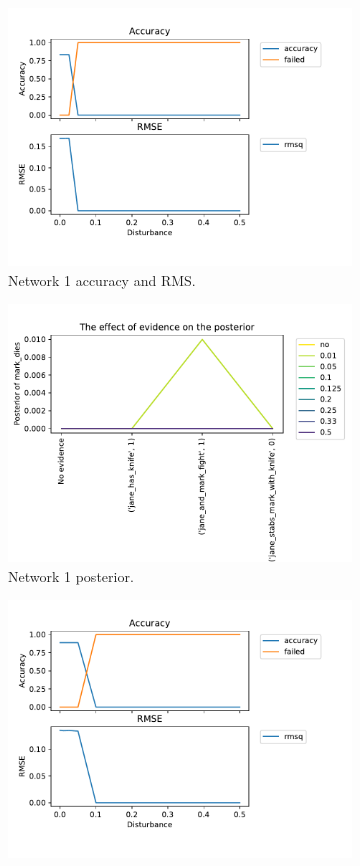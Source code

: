 \begin{enumerate}
\begin{figure}[htbp]
\begin{subfigure}{.5\textwidth}
 \centering
\includegraphics[width=0.9\linewidth]{images/performance_KB1.pdf}
\caption{Network 1 accuracy and RMS.}
\label{kb1a1}
\end{subfigure}%
\begin{subfigure}{.5\textwidth}
 \centering
\includegraphics[width=0.9\linewidth]{../experiments/VlekNetwork/plots/posterior_KB1.pdf}
\caption{Network 1 posterior.}
\label{kb1a}
\end{subfigure}
\begin{subfigure}{.5\textwidth}
\centering
\includegraphics[width=0.9\linewidth]{images/performance_KB2.pdf}

\end{subfigure}
\end{figure}
\end{enumerate}
